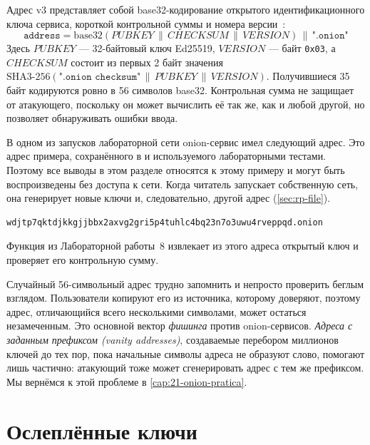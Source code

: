 Адрес v3 представляет собой base32-кодирование открытого идентификационного ключа сервиса, короткой контрольной суммы и номера версии~:
\[
\texttt{address} = \mathrm{base32}(\mathit{PUBKEY} \,\|\, \mathit{CHECKSUM} \,\|\, \mathit{VERSION}) \,\|\, \texttt{".onion"}
\]
Здесь $\mathit{PUBKEY}$ — 32-байтовый ключ Ed25519, $\mathit{VERSION}$ — байт \texttt{0x03}, а $\mathit{CHECKSUM}$ состоит из первых 2 байт значения $\mathrm{SHA3\text{-}256}(\texttt{".onion checksum"} \,\|\, \mathit{PUBKEY} \,\|\, \mathit{VERSION})$. Получившиеся 35 байт кодируются ровно в 56 символов base32. Контрольная сумма не защищает от атакующего, поскольку он может вычислить её так же, как и любой другой, но позволяет обнаруживать ошибки ввода.

В одном из запусков лабораторной сети onion-сервис имел следующий адрес. Это адрес примера, сохранённого в  и используемого лабораторными тестами. Поэтому все выводы в этом разделе относятся к этому примеру и могут быть воспроизведены без доступа к сети. Когда читатель запускает собственную сеть, она генерирует новые ключи и, следовательно, другой адрес (\cref{sec:rp-file}).
\begin{lstlisting}[numbers=none]
wdjtp7qktdjkkgjjbbx2axvg2gri5p4tuhlc4bq23n7o3uwu4rveppqd.onion
\end{lstlisting}
Функция  из Лабораторной работы~8 извлекает из этого адреса открытый ключ и проверяет его контрольную сумму.

\begin{attenzione}
Случайный 56-символьный адрес трудно запомнить и непросто проверить беглым взглядом. Пользователи копируют его из источника, которому доверяют, поэтому адрес, отличающийся всего несколькими символами, может остаться незамеченным. Это основной вектор \emph{фишинга} против onion-сервисов. \emph{Адреса с заданным префиксом (vanity addresses)}, создаваемые перебором миллионов ключей до тех пор, пока начальные символы адреса не образуют слово, помогают лишь частично: атакующий тоже может сгенерировать адрес с тем же префиксом. Мы вернёмся к этой проблеме в \cref{cap:21-onion-pratica}.
\end{attenzione}

\section{Ослеплённые ключи}\label{sec:os-accecate}

